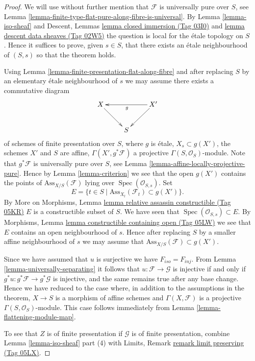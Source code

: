 \documentclass{amsart}
\theoremstyle{plain}
\theoremstyle{definition}
\theoremstyle{remark}
\numberwithin{equation}{subsection}
\def\Spec{\mathop{\mathrm{Spec}}}
\begin{document}
\begin{proof}
We will use without further mention that $\mathcal{F}$ is universally pure
over $S$, see
Lemma \ref{lemma-finite-type-flat-pure-along-fibre-is-universal}.
By
Lemma \ref{lemma-iso-sheaf}
and
Descent, Lemmas \href{https://stacks.math.columbia.edu/tag/03I0}{lemma closed immersion (Tag 03I0)} and
\href{https://stacks.math.columbia.edu/tag/02W5}{lemma descent data sheaves (Tag 02W5)}
the question is local for the \'etale topology on $S$.
Hence it suffices to prove, given $s \in S$, that there exists
an \'etale neighbourhood of $(S, s)$ so that the theorem holds.

\medskip\noindent
Using
Lemma \ref{lemma-finite-presentation-flat-along-fibre}
and after replacing $S$ by an elementary \'etale neighbourhood of $s$
we may assume there exists a commutative diagram
$$
\xymatrix{
X \ar[dr] & & X' \ar[ll]^g \ar[ld] \\
& S &
}
$$
of schemes of finite presentation over $S$,
where $g$ is \'etale, $X_s \subset g(X')$, the schemes $X'$ and $S$ are affine,
$\Gamma(X', g^*\mathcal{F})$ a projective $\Gamma(S, \mathcal{O}_S)$-module.
Note that $g^*\mathcal{F}$ is universally pure over $S$, see
Lemma \ref{lemma-affine-locally-projective-pure}.
Hence by
Lemma \ref{lemma-criterion}
we see that the open $g(X')$ contains the points of
$\text{Ass}_{X/S}(\mathcal{F})$ lying over $\Spec(\mathcal{O}_{S, s})$.
Set
$$
E = \{t \in S \mid \text{Ass}_{X_t}(\mathcal{F}_t) \subset g(X') \}.
$$
By
More on Morphisms,
Lemma \href{https://stacks.math.columbia.edu/tag/05KR}{lemma relative assassin constructible (Tag 05KR)}
$E$ is a constructible subset of $S$. We have seen that
$\Spec(\mathcal{O}_{S, s}) \subset E$. By
Morphisms, Lemma \href{https://stacks.math.columbia.edu/tag/05LW}{lemma constructible containing open (Tag 05LW)}
we see that $E$ contains an open neighbourhood of $s$. Hence after
replacing $S$ by a smaller affine neighbourhood of $s$ we may assume that
$\text{Ass}_{X/S}(\mathcal{F}) \subset g(X')$.

\medskip\noindent
Since we have assumed that $u$ is surjective we have $F_{iso} = F_{inj}$. From
Lemma \ref{lemma-universally-separating}
it follows that $u : \mathcal{F} \to \mathcal{G}$ is injective if and only if
$g^*u : g^*\mathcal{F} \to g^*\mathcal{G}$ is injective, and the same remains
true after any base change. Hence we have reduced to the case where,
in addition to the assumptions in the theorem, $X \to S$ is a morphism of
affine schemes and $\Gamma(X, \mathcal{F})$ is a projective
$\Gamma(S, \mathcal{O}_S)$-module. This case follows immediately from
Lemma \ref{lemma-flattening-module-map}.

\medskip\noindent
To see that $Z$ is of finite presentation if $\mathcal{G}$ is of finite
presentation, combine
Lemma \ref{lemma-iso-sheaf} part (4)
with
Limits, Remark \href{https://stacks.math.columbia.edu/tag/05LX}{remark limit preserving (Tag 05LX)}.
\end{proof}
\end{document}
